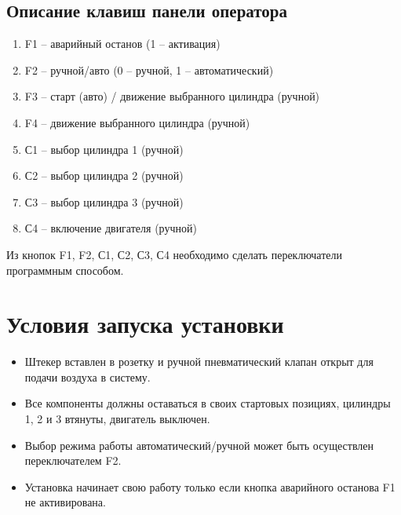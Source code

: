 \subsection{Описание клавиш панели оператора}
\begin{enumerate}
    \item F1 -- аварийный останов (1 – активация)
    \item F2 -- ручной/авто (0 – ручной, 1 – автоматический)
    \item F3 -- старт (авто) / движение выбранного цилиндра (ручной)
    \item F4 -- движение выбранного цилиндра (ручной)
    \item С1 -- выбор цилиндра 1 (ручной)
    \item С2 -- выбор цилиндра 2 (ручной)
    \item С3 -- выбор цилиндра 3 (ручной)
    \item С4 -- включение двигателя (ручной)
\end{enumerate}

Из кнопок F1, F2, С1, С2, С3, С4 необходимо сделать переключатели
программным способом.

\section{Условия запуска установки}
\begin{itemize}
    \item Штекер вставлен в розетку и ручной пневматический клапан открыт для подачи воздуха в систему.
    \item Все компоненты должны оставаться в своих стартовых позициях, цилиндры 1, 2 и 3 втянуты, двигатель выключен.
    \item Выбор режима работы автоматический/ручной может быть осуществлен переключателем F2.
    \item Установка начинает свою работу только если кнопка аварийного останова F1 не активирована.
\end{itemize}


